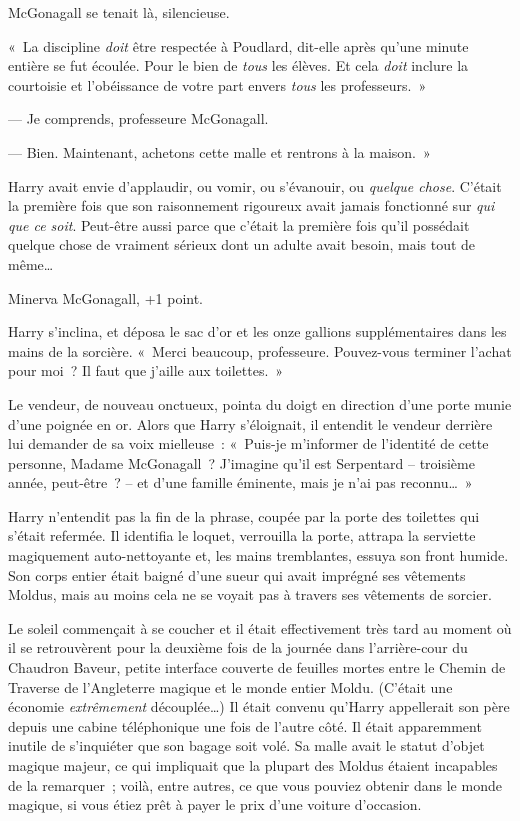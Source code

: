McGonagall se tenait là, silencieuse.

«~La discipline \emph{doit} être respectée à Poudlard, dit-elle après qu'une minute entière se fut écoulée. Pour le bien de \emph{tous} les élèves. Et cela \emph{doit} inclure la courtoisie et l'obéissance de votre part envers \emph{tous} les professeurs.~»

--- Je comprends, professeure McGonagall.

--- Bien. Maintenant, achetons cette malle et rentrons à la maison.~»

Harry avait envie d'applaudir, ou vomir, ou s'évanouir, ou \emph{quelque chose}.
C'était la première fois que son raisonnement rigoureux avait jamais fonctionné sur \emph{qui que ce soit}.
Peut-être aussi parce que c'était la première fois qu'il possédait quelque chose de vraiment sérieux dont un adulte avait besoin, mais tout de même…

Minerva McGonagall, +1 point.

Harry s'inclina, et déposa le sac d'or et les onze gallions supplémentaires dans les mains de la sorcière.
«~Merci beaucoup, professeure. Pouvez-vous terminer l'achat pour moi~?
Il faut que j'aille aux toilettes.~»

Le vendeur, de nouveau onctueux, pointa du doigt en direction d'une porte munie d'une poignée en or.
Alors que Harry s'éloignait, il entendit le vendeur derrière lui demander de sa voix mielleuse~:
«~Puis-je m'informer de l'identité de cette personne, Madame McGonagall~? J'imagine qu'il est Serpentard -- troisième année, peut-être~? -- et d'une famille éminente, mais je n'ai pas reconnu…~»

Harry n'entendit pas la fin de la phrase, coupée par la porte des toilettes qui s'était refermée.
Il identifia le loquet, verrouilla la porte, attrapa la serviette magiquement auto-nettoyante et, les mains tremblantes, essuya son front humide.
Son corps entier était baigné d'une sueur qui avait imprégné ses vêtements Moldus, mais au moins cela ne se voyait pas à travers ses vêtements de sorcier.

\later

Le soleil commençait à se coucher et il était effectivement très tard au moment où il se retrouvèrent pour la deuxième fois de la journée dans l'arrière-cour du Chaudron Baveur, petite interface couverte de feuilles mortes entre le Chemin de Traverse de l'Angleterre magique et le monde entier Moldu.
(C'était une économie \emph{extrêmement} découplée…) 
Il était convenu qu'Harry appellerait son père depuis une cabine téléphonique une fois de l'autre côté.
Il était apparemment inutile de s'inquiéter que son bagage soit volé.
Sa malle avait le statut d'objet magique majeur, ce qui impliquait que la plupart des Moldus étaient incapables de la remarquer~;
voilà, entre autres, ce que vous pouviez obtenir dans le monde magique, si vous étiez prêt à payer le prix d'une voiture d'occasion.

